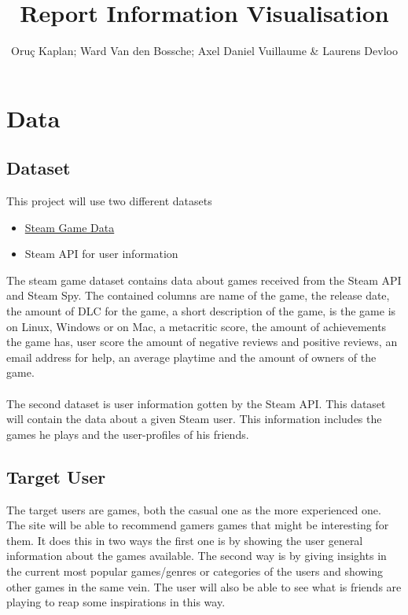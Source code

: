 \documentclass{article}
\begin{document}
	\title{Report Information Visualisation}
	\author{Oruç Kaplan; Ward Van den Bossche; Axel Daniel Vuillaume \& Laurens Devloo}
	\maketitle
	\tableofcontents
	\newpage
	
	\section{Data}
	
	\subsection{Dataset}
	
	This project will use two different datasets
	
	\begin{itemize}
		\item \href{https://www.kaggle.com/datasets/fronkongames/steam-games-dataset/code}{Steam Game Data}
		\item Steam API for user information
	\end{itemize}
	
	The steam game dataset contains data about games received from the Steam API and Steam Spy. The contained columns are name of the game, the release date, the amount of DLC for the game, a short description of the game, is the game is on Linux, Windows or on Mac, a metacritic score, the amount of achievements the game has, user score the amount of negative reviews and positive reviews, an email address for help, an average playtime and the amount of owners of the game.\\
	\\
	The second dataset is user information gotten by the Steam API. This dataset will contain the data about a given Steam user. This information includes the games he plays and the user-profiles of his friends.
	
	\subsection{Target User}
	
	The target users are games, both the casual one as the more experienced one. The site will be able to recommend gamers games that might be interesting for them. It does this in two ways the first one is by showing the user general information about the games available. The second way is by giving insights in the current most popular games/genres or categories of the users and showing other games in the same vein. The user will also be able to see what is friends are playing to reap some inspirations in this way.
	
\end{document}
